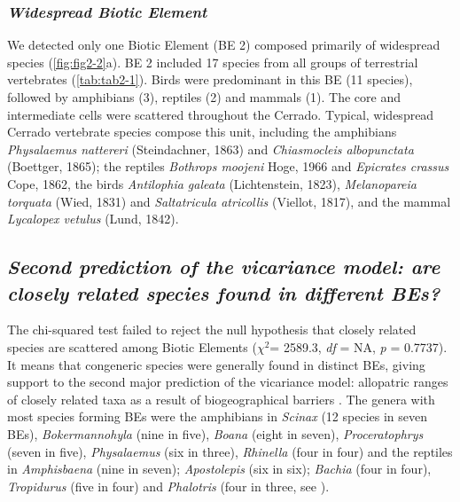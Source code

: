 \documentclass[12pt,openright,oneside,a4paper,english]{abntex2}
\begin{document}
\subsubsection{\textit{Widespread Biotic Element}}

We detected only one Biotic Element (BE 2) composed primarily of widespread species (\autoref{fig:fig2-2}a). BE 2 included 17 species from all groups of terrestrial vertebrates (\autoref{tab:tab2-1}). Birds were predominant in this BE (11 species), followed by amphibians (3), reptiles (2) and mammals (1). The core and intermediate cells were scattered throughout the Cerrado. Typical, widespread Cerrado vertebrate species compose this unit, including the amphibians \textit{Physalaemus nattereri} (Steindachner, 1863) and \textit{Chiasmocleis albopunctata} (Boettger, 1865); the reptiles \textit{Bothrops moojeni} Hoge, 1966 and \textit{Epicrates crassus} Cope, 1862, the birds \textit{Antilophia galeata} (Lichtenstein, 1823), \textit{Melanopareia torquata} (Wied, 1831) and \textit{Saltatricula atricollis} (Viellot, 1817), and the mammal \textit{Lycalopex vetulus} (Lund, 1842).

\subsection{\textit{Second prediction of the vicariance model: are closely related species found in different BEs?}}

The chi-squared test failed to reject the null hypothesis that closely related species are scattered among Biotic Elements ($\chi^2$= 2589.3, \textit{df} = NA, \textit{p} = 0.7737). It means that congeneric species were generally found in distinct BEs, giving support to the second major prediction of the vicariance model: allopatric ranges of closely related taxa as a result of biogeographical barriers \citep{Hausdorf2006}. The genera with most species forming BEs were the amphibians in \textit{Scinax} (12 species in seven BEs), \textit{Bokermannohyla} (nine in five), \textit{Boana} (eight in seven), \textit{Proceratophrys} (seven in five), \textit{Physalaemus} (six in three), \textit{Rhinella} (four in four) and the reptiles in \textit{Amphisbaena} (nine in seven); \textit{Apostolepis} (six in six); \textit{Bachia} (four in four), \textit{Tropidurus} (five in four) and \textit{Phalotris} (four in three, see ).
\end{document}
